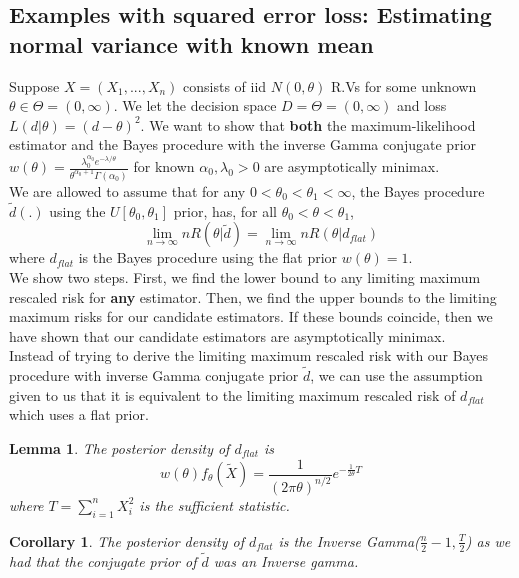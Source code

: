 \documentclass[twoside]{article}
\newtheorem{lemma}[theorem]{Lemma}
\newtheorem{corollary}[theorem]{Corollary}
\begin{document}
\subsection{Examples with squared error loss: Estimating normal variance with known mean}
 
Suppose $X = (X_1,...,X_n)$ consists of iid $N(0,\theta)$ R.Vs for some unknown $\theta \in \Theta = (0,\infty).$ We let the decision space $D = \Theta = (0,\infty)$ and loss $L(d|\theta) = (d - \theta)^2.$ We want to show that \textbf{both} the maximum-likelihood estimator and the Bayes procedure with the inverse Gamma conjugate prior $w(\theta) = \frac{\lambda_{0}^{\alpha_{0}}e^{-\lambda/\theta}}{\theta^{\alpha_{0}+1}\Gamma(\alpha_{0})}$ for known $\alpha_0, \lambda_0 > 0$ are asymptotically minimax.\\

We are allowed to assume that for any $0 < \theta_0 < \theta_1 < \infty$, the Bayes procedure $\tilde{d}(.)$ using the $U[\theta_0, \theta_1]$ prior, has, for all $\theta_0 < \theta < \theta_1$,
$$
\lim_{n \rightarrow \infty}nR(\theta|\tilde{d}) = \lim_{n \rightarrow \infty}nR(\theta|d_{flat})
$$
where $d_{flat}$ is the Bayes procedure using the flat prior $w(\theta) = 1.$\\

We show two steps. First, we find the lower bound to any limiting maximum rescaled risk for \textbf{any} estimator. Then, we find the upper bounds to the limiting maximum risks for our candidate estimators. If these bounds coincide, then we have shown that our candidate estimators are asymptotically minimax.\\

Instead of trying to derive the limiting maximum rescaled risk with our Bayes procedure with inverse Gamma conjugate prior $\tilde{d}$, we can use the assumption given to us that it is equivalent to the limiting maximum rescaled risk of $d_{flat}$ which uses a flat prior.

\begin{lemma}The posterior density of $d_{flat}$ is 
$$
w(\theta)f_{\theta}(\tilde{X}) = \frac{1}{(2\pi \theta)^{n/2}}e^{-\frac{1}{2\theta}T}
$$
where $T = \sum_{i=1}^{n}X_i^2$ is the sufficient statistic.
\end{lemma}

\begin{corollary}The posterior density of $d_{flat}$ is the Inverse Gamma($\frac{n}{2}-1, \frac{T}{2}$) as we had that the conjugate prior of $\tilde{d}$ was an Inverse gamma.
\end{corollary}
\end{document}
